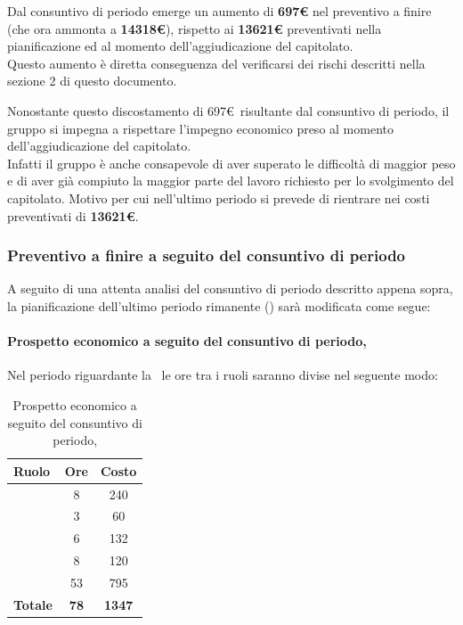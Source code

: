 Dal consuntivo di periodo emerge un aumento di \textbf{697\euro} nel preventivo a finire (che ora ammonta a \textbf{14318\euro}), rispetto ai \textbf{13621\euro} preventivati nella pianificazione ed al momento dell'aggiudicazione del capitolato.\\
Questo aumento è diretta conseguenza del verificarsi dei rischi descritti nella sezione 2 di questo documento.

Nonostante questo discostamento di 697\euro\ risultante dal consuntivo di periodo, il gruppo si impegna a rispettare l'impegno economico preso al momento dell'aggiudicazione del capitolato.\\
Infatti il gruppo è anche consapevole di aver superato le difficoltà di maggior peso e di aver già compiuto la maggior parte del lavoro richiesto per lo svolgimento del capitolato. Motivo per cui nell'ultimo periodo si prevede di rientrare nei costi preventivati di \textbf{13621\euro}. \\

\subsubsection{Preventivo a finire a seguito del consuntivo di periodo}
A seguito di una attenta analisi del consuntivo di periodo descritto appena sopra, la pianificazione dell'ultimo periodo rimanente (\VV) sarà modificata come segue:

\paragraph{Prospetto economico a seguito del consuntivo di periodo, \VV}
Nel periodo riguardante la \VV\ le ore tra i ruoli saranno divise nel seguente modo:
\begin{table}[h]
	\begin{center}
		\begin{tabular}{|l|c|c|}
			\hline
			\textbf{Ruolo}	& \textbf{Ore} &	\textbf{Costo}	 \\
			\hline
			\textit{\Pm}	&	8	&	240		\\
			\hline
			\textit{\Am}	&	3	&	60		\\ 
			\hline
			\textit{\Prog}	&	6	&	132	\\
			\hline
			\textit{\Progr}	&	8	&	120	\\ 
			\hline
			\textit{\Ver}	&	53	&	795	\\
			\hline
			\textbf{Totale}	&	\textbf{78}	&	\textbf{1347}	\\
			\hline
						
		\end{tabular}
	\end{center}
	\caption{Prospetto economico a seguito del consuntivo di periodo, \VV}
\end{table}

